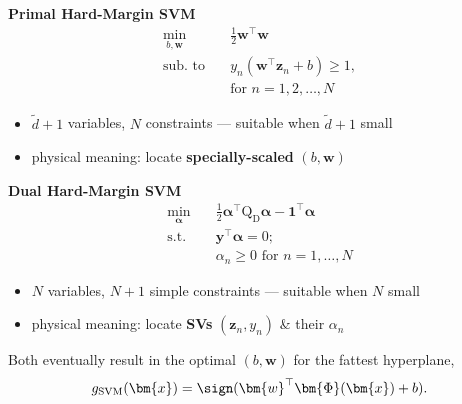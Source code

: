 \begin{center}
    \begin{minipage}[t]{0.47\textwidth}
        \textbf{Primal Hard-Margin SVM}
        \[
            \begin{aligned}
                \min_{b, \bm{w}} \quad & \frac{1}{2} \bm{w}^\top \bm{w}\\
                \text{sub.\ to} \quad & y_n (\bm{w}^\top \bm{z}_n + b) \ge
                    1,\\
                & \text{for } n = 1, 2, \dots , N
            \end{aligned}
        \]
        \begin{itemize}
            \item \(\tilde{d} + 1\) variables, \(N\) constraints ---
                suitable when \(\tilde{d} + 1\) small
            \item physical meaning: locate \textbf{specially-scaled}
                \((b, \bm{w})\)
        \end{itemize}
    \end{minipage}%
    \hfill
    \begin{minipage}[t]{0.47\textwidth}
        \textbf{Dual Hard-Margin SVM}
        \[
            \begin{aligned}
                \min_{\bm{\alpha}} \quad & \frac{1}{2} \bm{\alpha}^\top
                    \mathrm{Q}_{\mathrm{D}} \bm{\alpha} - \bm{1}^\top
                    \bm{\alpha}\\
                \text{s.t.} \quad & \bm{y}^\top \bm{\alpha} = 0;\\
                & \alpha_n \ge 0 \text{ for } n = 1, \dots , N
            \end{aligned}
        \]
        \begin{itemize}
            \item \(N\) variables, \(N + 1\) simple constraints ---
                suitable when \(N\) small
            \item physical meaning: locate \textbf{SVs} \((\bm{z}_n, y_n)\)
                \& their \(\alpha_n\)
        \end{itemize}
    \end{minipage}
\end{center}

\begin{moral}
    Both eventually result in the optimal \((b, \bm{w})\) for the fattest
    hyperplane,
    \[
        g_{\mathrm{SVM}}(\bm{x}) = \sign(\bm{w}^\top \bm{\Phi}(\bm{x}) +
        b).
    \]
\end{moral}

